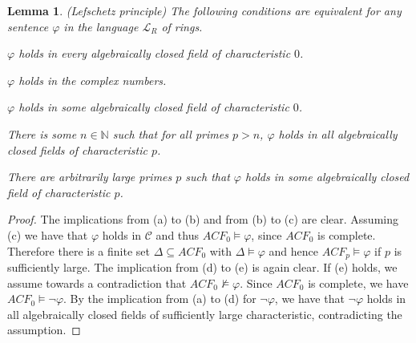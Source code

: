 \documentclass[10pt]{amsart}
\renewcommand{\L}{\mathcal{L}}
\newcommand{\NNN}{\mathbb{N}}
\newcommand{\CC}{\mathcal{C}}
\newtheorem{lemma}[theorem]{Lemma}
\theoremstyle{definition}
\theoremstyle{remark}
\newenvironment{enumerate-(a)}{\begin{enumerate}[label={\upshape (\alph*)}, leftmargin=2pc]}{\end{enumerate}}
\begin{document}
\begin{lemma} \label{Lefschetz principle} (Lefschetz principle) 
The following conditions are equivalent for any sentence $\varphi$ in the language $\L_R$ of rings. 
\begin{enumerate-(a)} 
\item 
$\varphi$ holds in every algebraically closed field of characteristic $0$. 
\item 
$\varphi$ holds in the complex numbers. 
\item 
$\varphi$ holds in some algebraically closed field of characteristic $0$. 
\item 
There is some $n\in\NNN$ such that for all primes $p>n$, $\varphi$ holds in all algebraically closed fields of characteristic $p$. 
\item 
There are arbitrarily large primes $p$ such that $\varphi$ holds in some algebraically closed field of characteristic $p$. 
\end{enumerate-(a)} 
\end{lemma} 
\begin{proof} 
The implications from (a) to (b) and from (b) to (c) are clear. Assuming (c) we have that $\varphi$ holds in $\CC$ and thus $ACF_0\models \varphi$, since $ACF_0$ is complete. Therefore there is a finite set $\Delta\subseteq ACF_0$ with $\Delta \models \varphi$ and hence $ACF_p\models \varphi$ if $p$ is sufficiently large. 
The implication from (d) to (e) is again clear. 
If (e) holds, we assume towards a contradiction that $ACF_0\not\models \varphi$. Since $ACF_0$ is complete, we have $ACF_0\models \neg\varphi$. By the implication from (a) to (d) for $\neg\varphi$, we have that $\neg\varphi$ holds in all algebraically closed fields of sufficiently large characteristic, contradicting the assumption. 
\end{proof} 
\end{document}
